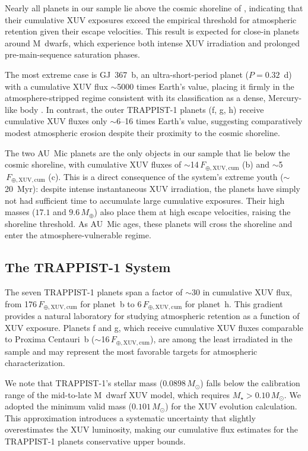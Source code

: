 \documentclass[twocolumn]{aastex631}
\newcommand{\Fearth}{F_{\oplus,\mathrm{XUV,cum}}}
\newcommand{\Msun}{M_{\odot}}
\newcommand{\Mearth}{M_{\oplus}}
\begin{document}
Nearly all planets in our sample lie above the cosmic shoreline of
\citet{ZahnleCatling2017}, indicating that their cumulative XUV exposures
exceed the empirical threshold for atmospheric retention given their escape
velocities. This result is expected for close-in planets around M~dwarfs, which
experience both intense XUV irradiation and prolonged pre-main-sequence
saturation phases.

The most extreme case is GJ~367~b, an ultra-short-period planet ($P = 0.32$~d)
with a cumulative XUV flux $\sim$5000 times Earth's value, placing it firmly in
the atmosphere-stripped regime consistent with its classification as a dense,
Mercury-like body \citep{Goffo2023}. In contrast, the outer TRAPPIST-1 planets
(f, g, h) receive cumulative XUV fluxes only $\sim$6--16 times Earth's value,
suggesting comparatively modest atmospheric erosion despite their proximity to
the cosmic shoreline.

The two AU~Mic planets are the only objects in our sample that lie below the
cosmic shoreline, with cumulative XUV fluxes of $\sim$14$\,\Fearth$ (b) and
$\sim$5$\,\Fearth$ (c). This is a direct consequence of the system's extreme
youth ($\sim$20~Myr): despite intense instantaneous XUV irradiation, the
planets have simply not had sufficient time to accumulate large cumulative
exposures. Their high masses ($17.1$ and $9.6\,\Mearth$) also place them at
high escape velocities, raising the shoreline threshold. As AU~Mic ages, these
planets will cross the shoreline and enter the atmosphere-vulnerable regime.

\subsection{The TRAPPIST-1 System}

The seven TRAPPIST-1 planets span a factor of $\sim$30 in cumulative XUV flux,
from 176$\,\Fearth$ for planet~b to 6$\,\Fearth$ for planet~h. This gradient
provides a natural laboratory for studying atmospheric retention as a function
of XUV exposure. Planets f and g, which receive cumulative XUV fluxes
comparable to Proxima Centauri~b ($\sim$16$\,\Fearth$), are among the least
irradiated in the sample and may represent the most favorable targets for
atmospheric characterization.

We note that TRAPPIST-1's stellar mass ($0.0898\,\Msun$) falls below the
calibration range of the \citet{Engle2024} mid-to-late M~dwarf XUV model,
which requires $M_\star > 0.10\,\Msun$. We adopted the minimum valid mass
($0.101\,\Msun$) for the XUV evolution calculation. This approximation
introduces a systematic uncertainty that slightly overestimates the XUV
luminosity, making our cumulative flux estimates for the TRAPPIST-1 planets
conservative upper bounds.
\end{document}
